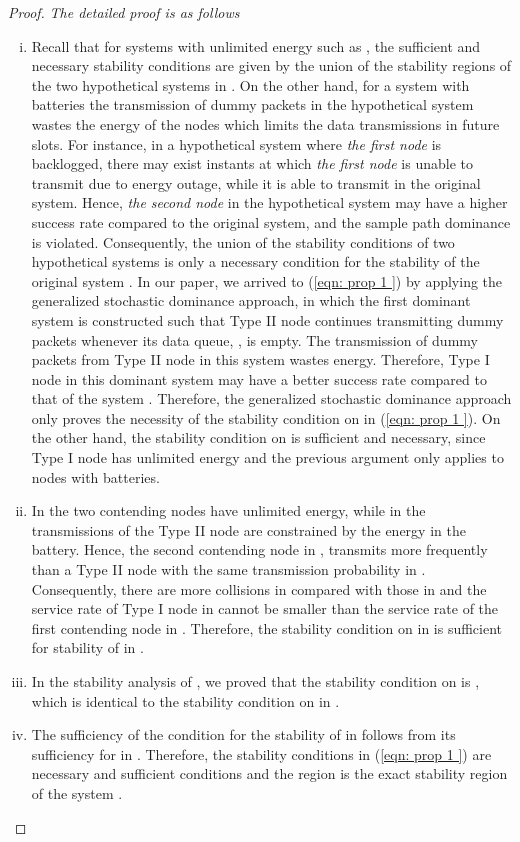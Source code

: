 \documentclass[draftcls,12pt,onecolumn]{IEEEtran}
\begin{document}
\begin{proof}
\textit{The detailed proof is as follows}
\begin{enumerate}[(i)]
\item Recall that for systems with unlimited energy such as , the sufficient and necessary stability conditions are given by the union of the stability regions of the two hypothetical systems in \cite{rao1988stability}. On the other hand, for a system with batteries the transmission of dummy packets in the hypothetical system wastes the energy of the nodes which limits the data transmissions in future slots. For instance, in a hypothetical system where \emph{the first node} is backlogged, there may exist instants at which \emph{the first node} is unable to transmit due to energy outage, while it is able to transmit in the original system. Hence, \emph{the second node} in the hypothetical system may have a higher success rate compared to the original system, and the sample path dominance is violated. Consequently, the union of the stability conditions of two hypothetical systems is only a necessary condition for the stability of the original system \cite{jeon2015stability}. 
In our paper, we arrived to (\ref{eqn: prop 1 }) by applying the generalized stochastic dominance approach, in which the first dominant system is constructed such that Type II node continues transmitting dummy packets whenever its data queue, , is empty. The transmission of dummy packets from Type II node in this system wastes energy. Therefore, Type I node in this dominant system may have a better success rate compared to that of the system . Therefore, the generalized stochastic dominance approach only proves the necessity of the stability condition on  in (\ref{eqn: prop 1 }). On the other hand, the stability condition on  is sufficient and necessary, since Type I node has unlimited energy and the previous argument only applies to nodes with batteries.

\item In  the two contending nodes have unlimited energy, while in  the transmissions of the Type II node are constrained by the energy in the battery. Hence, the second contending node in , transmits more frequently than a Type II node with the same transmission probability  in . Consequently, there are more collisions in  compared with those in  and the service rate of Type I node in  cannot be smaller than the service rate of the first contending node in . Therefore, the stability condition on  in  is sufficient for stability of  in .

\item In the stability analysis of , we proved that the stability condition on  is , which is identical to the stability condition on  in  \cite{rao1988stability}.

\item The sufficiency of the condition  for the stability of  in  follows from its sufficiency for  in . Therefore, the stability conditions in (\ref{eqn: prop 1 }) are necessary and sufficient conditions and the region  is the exact stability region of the system .
\end{enumerate}
\end{proof}
\vspace{-0.3in}
\end{document}
